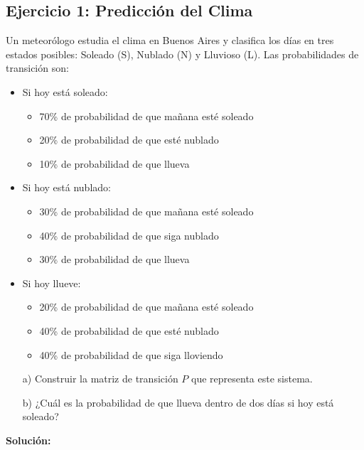 \documentclass[a4paper,11pt]{article}
\begin{document}
\subsection{Ejercicio 1: Predicción del Clima}

Un meteorólogo estudia el clima en Buenos Aires y clasifica los días en tres estados posibles: Soleado (S), Nublado (N) y Lluvioso (L). Las probabilidades de transición son:

\begin{itemize}
    \item Si hoy está soleado:
        \begin{itemize}
            \item 70\% de probabilidad de que mañana esté soleado
            \item 20\% de probabilidad de que esté nublado
            \item 10\% de probabilidad de que llueva
        \end{itemize}
    \item Si hoy está nublado:
        \begin{itemize}
            \item 30\% de probabilidad de que mañana esté soleado
            \item 40\% de probabilidad de que siga nublado
            \item 30\% de probabilidad de que llueva
        \end{itemize}
    \item Si hoy llueve:
        \begin{itemize}
            \item 20\% de probabilidad de que mañana esté soleado
            \item 40\% de probabilidad de que esté nublado
            \item 40\% de probabilidad de que siga lloviendo
        \end{itemize}
\end{itemize}

\begin{itemize}
    \item[a)] Construir la matriz de transición $P$ que representa este sistema.
    \item[b)] ¿Cuál es la probabilidad de que llueva dentro de dos días si hoy está soleado?
\end{itemize}

\textbf{Solución:}

\vspace{0.5em}
\end{document}
